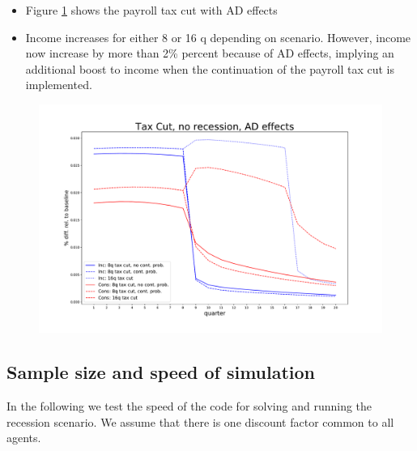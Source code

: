 \documentclass[]{article}
\begin{document}
\begin{itemize}
	\item Figure \ref{fig:taxcutnorecessionadeffects} shows the payroll tax cut with AD effects
	\item Income increases for either 8 or 16 q depending on scenario. However, income now increase by more than 2\% percent because of AD effects, implying an additional boost to income when the continuation of the payroll tax cut is implemented.
\end{itemize}
	
\begin{figure}
	\centering
	\includegraphics[width=\linewidth]{../ContinuationProb50/tax_cut_no_recession_AD_effects}
	\caption{}
	\label{fig:taxcutnorecessionadeffects}
\end{figure}



\FloatBarrier
\subsection{Sample size and speed of simulation}

In the following we test the speed of the code for solving and running the recession scenario. We assume that there is one discount factor common to all agents.
\end{document}
